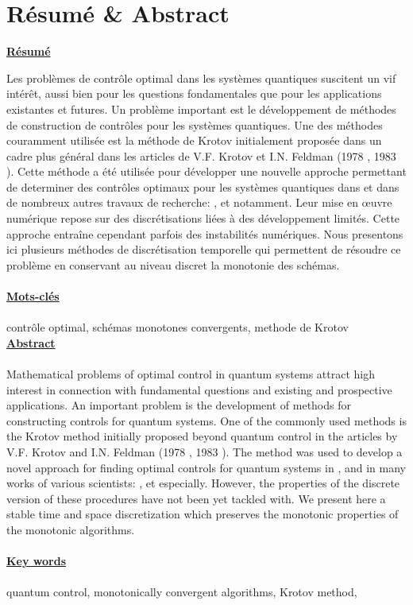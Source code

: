 \chapter*{Résumé \& Abstract}
\Large
\begin{flushleft}
\textbf{\underline{Résumé}}
\end{flushleft}
\normalsize
Les problèmes de contrôle optimal dans les systèmes quantiques suscitent un vif intérêt, aussi bien pour les questions fondamentales que pour les applications existantes et futures. Un problème important est le développement de méthodes de construction de contrôles pour les systèmes quantiques. Une des méthodes couramment utilisée est la méthode de Krotov initialement proposée dans un cadre plus général dans les articles de V.F. Krotov et I.N. Feldman (1978 \cite{Krotov1}, 1983 \cite{Krotov2}). Cette méthode a été utilisée pour développer une nouvelle approche permettant de determiner des contrôles optimaux pour les systèmes quantiques dans \cite{Tannor} et dans de nombreux autres travaux de recherche: \cite{Zhu}, \cite{Maday} et \cite{Salomon} notamment. Leur mise en œuvre numérique repose sur des discrétisations liées à des développement limités. Cette approche entraîne cependant parfois des instabilités numériques. Nous presentons ici plusieurs méthodes de discrétisation temporelle qui permettent de résoudre ce problème en conservant au niveau discret la monotonie des schémas.\\\\
\Large\textbf{\underline{Mots-clés}}\normalsize\\\\
contrôle optimal, schémas monotones convergents, methode de Krotov
\[\]
\Large\textbf{\underline{Abstract}}\\\\\normalsize
Mathematical problems of optimal control in quantum systems attract high interest in connection with fundamental questions and existing and prospective applications. An important problem is the development of methods for constructing controls for quantum systems. One of the commonly used methods is the Krotov method initially proposed beyond quantum control in the articles by V.F. Krotov and I.N. Feldman (1978 \cite{Krotov1}, 1983 \cite{Krotov2}). The method was used to develop a novel approach for finding optimal controls for quantum systems in \cite{Tannor}, and in many works of various scientists: \cite{Zhu}, \cite{Maday} et \cite{Salomon} especially. However, the properties of the discrete version of these procedures have not been yet tackled with.
We present here a stable time and space discretization which preserves the
monotonic properties of the monotonic algorithms.\\\\
\Large\textbf{\underline{Key words}}\normalsize\\\\
quantum control, monotonically convergent algorithms, Krotov method,

